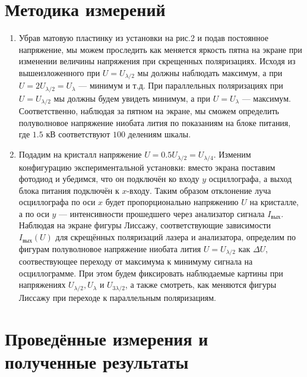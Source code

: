 \documentclass[12pt]{article}
\begin{document}
\section*{Методика измерений}
\begin{enumerate}
	\item
		Убрав матовую пластинку из установки на рис.2 и подав постоянное напряжение, мы можем проследить как меняется яркость пятна на экране при изменении величины напряжения при скрещенных поляризациях. Исходя из вышеизложенного при $U = U_\text{$\lambda / 2$}$ мы должны наблюдать максимум, а при $U = 2 U_\text{$\lambda / 2$} = U_\text{$\lambda$}$ --- минимум и т.д. При параллельных поляризациях при $U = U_\text{$\lambda / 2$}$ мы должны будем увидеть минимум, а при $U = U_\text{$\lambda$}$ --- максимум. Соответственно, наблюдая за пятном на экране, мы сможем определить полуволновое напряжение ниобата лития по показаниям на блоке питания, где $1.5$ кВ соответствуют $100$ делениям шкалы.
	\item
		Подадим на кристалл напряжение $U = 0.5 U_\text{$\lambda / 2$} = U_\text{$\lambda / 4$}$. Изменим конфигурацию экспериментальной установки: вместо экрана поставим фотодиод и убедимся, что он подключён ко входу $y$ осциллографа, а выход  блока питания подключён к $x$-входу. Таким образом отклонение луча осциллографа по оси $x$ будет пропорционально напряжению $U$ на кристалле, а по оси $y$ --- интенсивности прошедшего через анализатор сигнала  $I_\text{вых}$. Наблюдая на экране фигуры Лиссажу, соответствующие зависимости $I_\text{вых}(U)$ для скрещённых поляризаций лазера и анализатора, определим по фигурам полуволновое напряжение ниобата лития $U = U_\text{$\lambda / 2$}$ как $\Delta U$, соотвествующее переходу от максимума к минимуму сигнала на осциллограмме. При этом будем фиксировать наблюдаемые картины при напряжениях $U_\text{$\lambda / 2$}, U_\text{$\lambda$}$ и $U_\text{$3 \lambda / 2$}$, а также смотреть, как меняются фигуры Лиссажу при переходе к параллельным поляризациям.
\end{enumerate}
\newpage
\section*{Проведённые измерения и полученные результаты}
\end{document}
